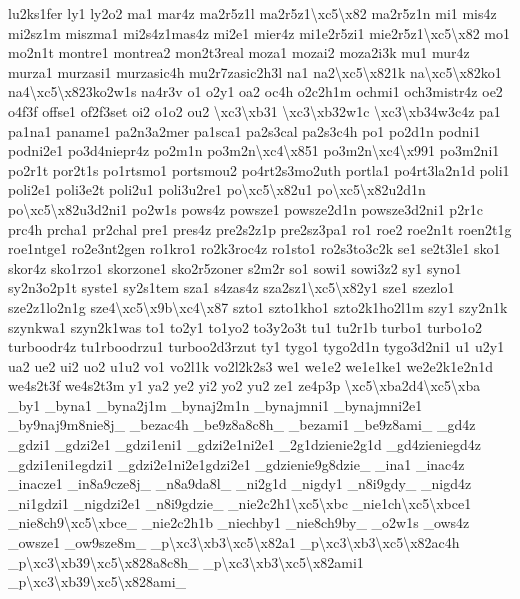 \begin{DoxyCompactItemize}
lu2ks1fer ly1 ly2o2 ma1 mar4z ma2r5z1l ma2r5z1\textbackslash{}xc5\textbackslash{}x82 ma2r5z1n mi1 mis4z mi2sz1m miszma1 mi2s4z1mas4z mi2e1 mier4z mi1e2r5zi1 mie2r5z1\textbackslash{}xc5\textbackslash{}x82 mo1 mo2n1t montre1 montrea2 mon2t3real moza1 mozai2 moza2i3k mu1 mur4z murza1 murzasi1 murzasic4h mu2r7zasic2h3l na1 na2\textbackslash{}xc5\textbackslash{}x821k na\textbackslash{}xc5\textbackslash{}x82ko1 na4\textbackslash{}xc5\textbackslash{}x823ko2w1s na4r3v o1 o2y1 oa2 oc4h o2c2h1m ochmi1 och3mistr4z oe2 o4f3f offse1 of2f3set oi2 o1o2 ou2 \textbackslash{}xc3\textbackslash{}xb31 \textbackslash{}xc3\textbackslash{}xb32w1c \textbackslash{}xc3\textbackslash{}xb34w3c4z pa1 pa1na1 paname1 pa2n3a2mer pa1sca1 pa2s3cal pa2s3c4h po1 po2d1n podni1 podni2e1 po3d4niepr4z po2m1n po3m2n\textbackslash{}xc4\textbackslash{}x851 po3m2n\textbackslash{}xc4\textbackslash{}x991 po3m2ni1 po2r1t por2t1s po1rtsmo1 portsmou2 po4rt2s3mo2uth portla1 po4rt3la2n1d poli1 poli2e1 poli3e2t poli2u1 poli3u2re1 po\textbackslash{}xc5\textbackslash{}x82u1 po\textbackslash{}xc5\textbackslash{}x82u2d1n po\textbackslash{}xc5\textbackslash{}x82u3d2ni1 po2w1s pows4z powsze1 powsze2d1n powsze3d2ni1 p2r1c prc4h prcha1 pr2chal pre1 pres4z pre2s2z1p pre2sz3pa1 ro1 roe2 roe2n1t roen2t1g roe1ntge1 ro2e3nt2gen ro1kro1 ro2k3roc4z ro1sto1 ro2s3to3c2k se1 se2t3le1 sko1 skor4z sko1rzo1 skorzone1 sko2r5zoner s2m2r so1 sowi1 sowi3z2 sy1 syno1 sy2n3o2p1t syste1 sy2s1tem sza1 s4zas4z sza2sz1\textbackslash{}xc5\textbackslash{}x82y1 sze1 szezlo1 sze2z1lo2n1g sze4\textbackslash{}xc5\textbackslash{}x9b\textbackslash{}xc4\textbackslash{}x87 szto1 szto1kho1 szto2k1ho2l1m szy1 szy2n1k szynkwa1 szyn2k1was to1 to2y1 to1yo2 to3y2o3t tu1 tu2r1b turbo1 turbo1o2 turboodr4z tu1rboodrzu1 turboo2d3rzut ty1 tygo1 tygo2d1n tygo3d2ni1 u1 u2y1 ua2 ue2 ui2 uo2 u1u2 vo1 vo2l1k vo2l2k2s3 we1 we1e2 we1e1ke1 we2e2k1e2n1d we4s2t3f we4s2t3m y1 ya2 ye2 yi2 yo2 yu2 ze1 ze4p3p \textbackslash{}xc5\textbackslash{}xba2d4\textbackslash{}xc5\textbackslash{}xba \-\_\-by1 \-\_\-byna1 \-\_\-byna2j1m \-\_\-bynaj2m1n \-\_\-bynajmni1 \-\_\-bynajmni2e1 \-\_\-by9naj9m8nie8j\-\_\- \-\_\-bezac4h \-\_\-be9z8a8c8h\-\_\- \-\_\-bezami1 \-\_\-be9z8ami\-\_\- \-\_\-gd4z \-\_\-gdzi1 \-\_\-gdzi2e1 \-\_\-gdzi1eni1 \-\_\-gdzi2e1ni2e1 \-\_\-2g1dzienie2g1d \-\_\-gd4zieniegd4z \-\_\-gdzi1eni1egdzi1 \-\_\-gdzi2e1ni2e1gdzi2e1 \-\_\-gdzienie9g8dzie\-\_\- \-\_\-ina1 \-\_\-inac4z \-\_\-inacze1 \-\_\-in8a9cze8j\-\_\- \-\_\-n8a9da8l\-\_\- \-\_\-ni2g1d \-\_\-nigdy1 \-\_\-n8i9gdy\-\_\- \-\_\-nigd4z \-\_\-ni1gdzi1 \-\_\-nigdzi2e1 \-\_\-n8i9gdzie\-\_\- \-\_\-nie2c2h1\textbackslash{}xc5\textbackslash{}xbc \-\_\-nie1ch\textbackslash{}xc5\textbackslash{}xbce1 \-\_\-nie8ch9\textbackslash{}xc5\textbackslash{}xbce\-\_\- \-\_\-nie2c2h1b \-\_\-niechby1 \-\_\-nie8ch9by\-\_\- \-\_\-o2w1s \-\_\-ows4z \-\_\-owsze1 \-\_\-ow9sze8m\-\_\- \-\_\-p\textbackslash{}xc3\textbackslash{}xb3\textbackslash{}xc5\textbackslash{}x82a1 \-\_\-p\textbackslash{}xc3\textbackslash{}xb3\textbackslash{}xc5\textbackslash{}x82ac4h \-\_\-p\textbackslash{}xc3\textbackslash{}xb39\textbackslash{}xc5\textbackslash{}x828a8c8h\-\_\- \-\_\-p\textbackslash{}xc3\textbackslash{}xb3\textbackslash{}xc5\textbackslash{}x82ami1 \-\_\-p\textbackslash{}xc3\textbackslash{}xb39\textbackslash{}xc5\textbackslash{}x828ami\-\_\- 
\end{DoxyCompactItemize}
